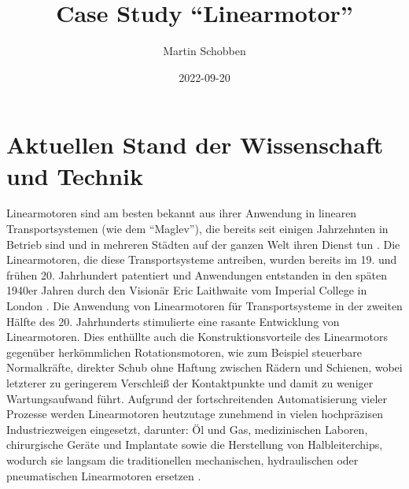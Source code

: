 \documentclass[
  oneside]{book}
\title{Case Study ``Linearmotor''}
\author{Martin Schobben}
\date{2022-09-20}
\begin{document}
\maketitle

\hypertarget{section}{%
\section*{}\label{section}}

\hypertarget{aktuellen-stand-der-wissenschaft-und-technik}{%
\section{Aktuellen Stand der Wissenschaft und Technik}\label{aktuellen-stand-der-wissenschaft-und-technik}}

Linearmotoren sind am besten bekannt aus ihrer Anwendung in linearen Transportsystemen (wie dem ``Maglev''), die bereits seit einigen Jahrzehnten in Betrieb sind und in mehreren Städten auf der ganzen Welt ihren Dienst tun \citep{hellinger2009, palka2021}. Die Linearmotoren, die diese Transportsysteme antreiben, wurden bereits im 19. und frühen 20. Jahrhundert patentiert und Anwendungen entstanden in den späten 1940er Jahren durch den Visionär Eric Laithwaite vom Imperial College in London \citep{hellinger2009}. Die Anwendung von Linearmotoren für Transportsysteme in der zweiten Hälfte des 20. Jahrhunderts stimulierte eine rasante Entwicklung von Linearmotoren. Dies enthüllte auch die Konstruktionsvorteile des Linearmotors gegenüber herkömmlichen Rotationsmotoren, wie zum Beispiel steuerbare Normalkräfte, direkter Schub ohne Haftung zwischen Rädern und Schienen, wobei letzterer zu geringerem Verschleiß der Kontaktpunkte und damit zu weniger Wartungsaufwand führt. Aufgrund der fortschreitenden Automatisierung vieler Prozesse werden Linearmotoren heutzutage zunehmend in vielen hochpräzisen Industriezweigen eingesetzt, darunter: Öl und Gas, medizinischen Laboren, chirurgische Geräte und Implantate sowie die Herstellung von Halbleiterchips, wodurch sie langsam die traditionellen mechanischen, hydraulischen oder pneumatischen Linearmotoren ersetzen \citep{gieras2018}.
\end{document}
